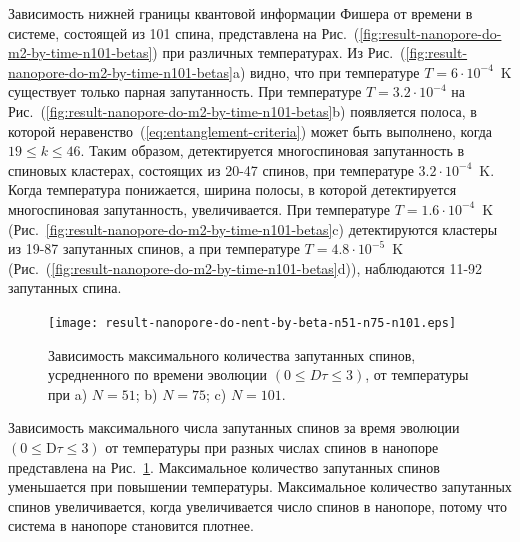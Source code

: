 Зависимость нижней границы квантовой информации Фишера от времени в системе, состоящей из 101 спина, представлена на Рис.~(\ref{fig:result-nanopore-do-m2-by-time-n101-betas}) при различных температурах.
Из Рис.~(\ref{fig:result-nanopore-do-m2-by-time-n101-betas}a) видно, что при температуре $T=6\cdot10^{-4}$~K существует только парная запутанность.
При температуре $T=3.2\cdot10^{-4}$ на Рис.~(\ref{fig:result-nanopore-do-m2-by-time-n101-betas}b) появляется полоса, в которой неравенство~(\ref{eq:entanglement-criteria}) может быть выполнено, когда $19 \leq k \leq 46$.
Таким образом, детектируется многоспиновая запутанность в спиновых кластерах, состоящих из 20-47 спинов, при температуре $3.2\cdot10^{-4}$~K.
Когда температура понижается, ширина полосы, в которой детектируется многоспиновая запутанность, увеличивается.
При температуре $T=1.6\cdot10^{-4}$~K (Рис.~\ref{fig:result-nanopore-do-m2-by-time-n101-betas}c) детектируются кластеры из 19-87 запутанных спинов, а при температуре $T=4.8\cdot10^{-5}$~K (Рис.~(\ref{fig:result-nanopore-do-m2-by-time-n101-betas}d)), наблюдаются 11-92 запутанных спина.

\begin{figure}[H]
 	\texttt{[image: result-nanopore-do-nent-by-beta-n51-n75-n101.eps]}
	\caption{
	  Зависимость максимального количества запутанных спинов,
	  усредненного по времени эволюции $(0 \leq D\tau \leq 3)$,
	  от температуры при  a) $N=51$; b) $N=75$; c) $N=101$.
	}
	\label{fig:result-nanopore-do-nent-by-beta-n51-n75-n101}
\end{figure}

Зависимость максимального числа запутанных спинов за время эволюции $({0}\leq \mathrm{D}\tau\leq{3})$ от температуры при разных числах спинов в нанопоре представлена на Рис.~\ref{fig:result-nanopore-do-nent-by-beta-n51-n75-n101}.
Максимальное количество запутанных спинов уменьшается при повышении температуры.
Максимальное количество запутанных спинов увеличивается, когда увеличивается число спинов в нанопоре, потому что система в нанопоре становится плотнее.


